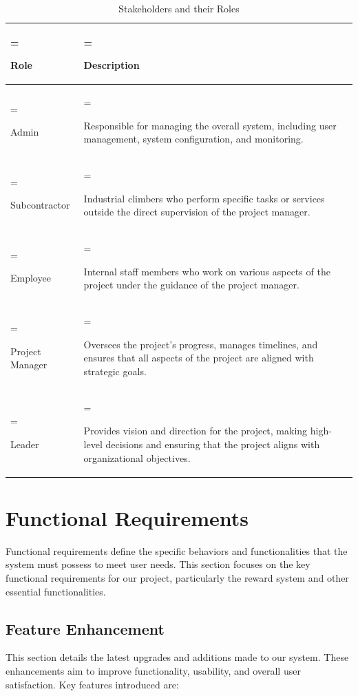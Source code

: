 \begin{table}[h!]
    \centering
    \renewcommand{\arraystretch}{1.5} %
    \caption{Stakeholders and their Roles}
    \label{tab:stakeholders_roles}
    \begin{tabularx}{\textwidth} {
            | >{\hsize=0.4\hsize\linewidth=\hsize\raggedright\arraybackslash}X
            | >{\hsize=1.6\hsize\linewidth=\hsize\raggedright\arraybackslash}X |}
        \hline
         \textbf{Role} & \textbf{Description} \\
        \hline
        Admin & Responsible for managing the overall system, including user management, system configuration, and monitoring. \\
        \hline
        \rowcolor{gray!20} Subcontractor & Industrial climbers who perform specific tasks or services outside the direct supervision of the project manager. \\
        \hline
        Employee & Internal staff members who work on various aspects of the project under the guidance of the project manager. \\
        \hline
        Project Manager & Oversees the project's progress, manages timelines, and ensures that all aspects of the project are aligned with strategic goals. \\
        \hline
        \rowcolor{gray!20} Leader & Provides vision and direction for the project, making high-level decisions and ensuring that the project aligns with organizational objectives. \\
        \hline
    \end{tabularx}
\end{table}
\section{Functional Requirements}
Functional requirements define the specific behaviors and functionalities that the system must possess to meet user needs. This section focuses on the key functional requirements for our project, particularly the reward system and other essential functionalities.

\subsection{Feature Enhancement}

This section details the latest upgrades and additions made to our system. These enhancements aim to improve functionality, usability, and overall user satisfaction. Key features introduced are:

